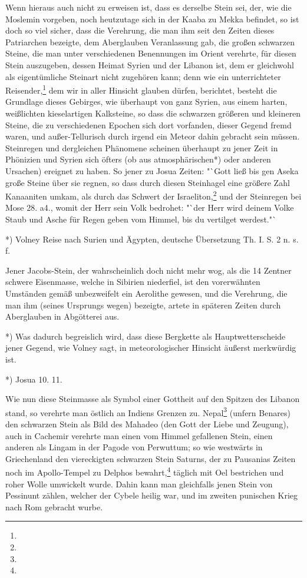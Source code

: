 \documentclass[a4paper, 11pt, oneside, polutonikogreek, german]{article}
\begin{document}
Wenn hieraus auch nicht zu erweisen ist, dass es derselbe Stein sei, der, wie die Moslemin vorgeben, noch heutzutage sich in der Kaaba zu Mekka befindet, so ist doch so viel sicher, dass die Verehrung, die man ihm seit den Zeiten dieses Patriarchen bezeigte, dem Aberglauben Veranlassung gab, die großen schwarzen Steine, die man unter verschiedenen Benennungen im Orient verehrte, für diesen Stein auszugeben, dessen Heimat Syrien und der Libanon ist, dem er gleichwohl als eigentümliche Steinart nicht zugehören kann; denn wie ein unterrichteter Reisender,\footnote{} dem wir in aller Hinsicht glauben dürfen, berichtet, besteht die Grundlage dieses Gebirges, wie überhaupt von ganz Syrien, aus einem harten, weißlichten kieselartigen Kalksteine, so dass die schwarzen größeren und kleineren Steine, die zu verschiedenen Epochen sich dort vorfanden, dieser Gegend fremd waren, und außer-Tellurisch durch irgend ein Meteor dahin gebracht sein müssen. Steinregen und dergleichen Phänomene scheinen überhaupt zu jener Zeit in Phönizien und Syrien sich öfters (ob aus atmosphärischen*) oder anderen Ursachen) ereignet zu haben. So jener zu Josua Zeiten: "`Gott ließ bis gen Aseka große Steine über sie regnen, so dass durch diesen Steinhagel eine größere Zahl Kanaaniten umkam, als durch das Schwert der Israeliton,\footnote{} und der Steinregen bei Mose 28. a4., womit der Herr sein Volk bedrohet: "`der Herr wird deinem Volke Staub und Asche für Regen geben vom Himmel, bis du vertilget werdest."`

*) Volney Reise nach Surien und Ägypten, deutsche Übersetzung Th. I. S. 2 n. s. f.

Jener Jacobs-Stein, der wahrscheinlich doch nicht mehr wog, als die 14 Zentner schwere Eisenmasse, welche in Sibirien niederfiel, ist den vorerwähnten Umständen gemäß unbezweifelt ein Aerolithe gewesen, und die Verehrung, die man ihm (seines Ursprungs wegen) bezeigte, artete in späteren Zeiten durch Aberglauben in Abgötterei aus.

*) Was dadurch begreislich wird, dass diese Bergkette als Hauptwetterscheide jener Gegend, wie Volney sagt, in meteorologischer Hinsicht äußerst merkwürdig ist.

*) Josua 10. 11.

Wie nun diese Steinmasse als Symbol einer Gottheit auf den Spitzen des Libanon stand, so verehrte man östlich an Indiens Grenzen zu. Nepal\footnote{} (unfern Benares) den schwarzen Stein als Bild des Mahadeo (den Gott der Liebe und Zeugung), auch in Cachemir verehrte man einen vom Himmel gefallenen Stein, einen anderen als Lingam in der Pagode von Perwuttum; so wie westwärts in Griechenland den viereckigten schwarzen Stein Saturns, der zu Pausanias Zeiten noch im Apollo-Tempel zu Delphos bewahrt,\footnote{} täglich mit Oel bestrichen und roher Wolle umwickelt wurde. Dahin kann man gleichfalls jenen Stein von Pessinunt zählen, welcher der Cybele heilig war, und im zweiten punischen Krieg nach Rom gebracht wurbe.
\end{document}
